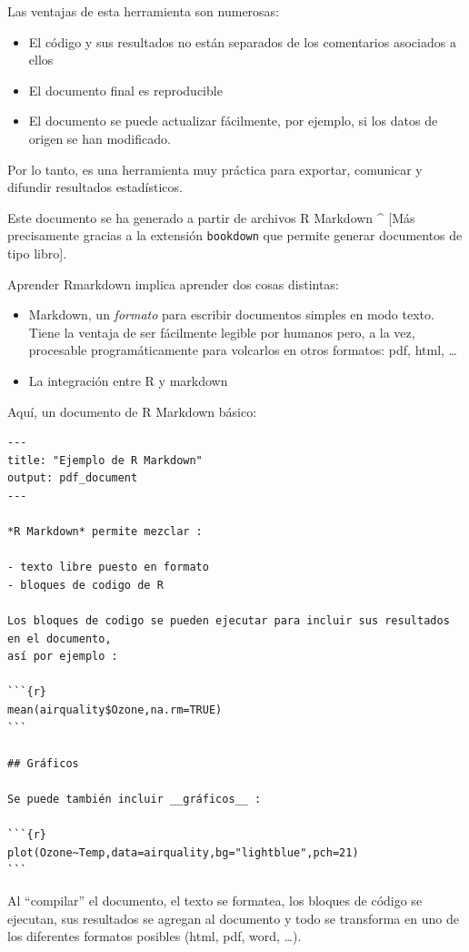 \documentclass[]{article}
\providecommand{\tightlist}{%
  \setlength{\itemsep}{0pt}\setlength{\parskip}{0pt}}
\numberwithin{ejcnt}{section}
\begin{document}
Las ventajas de esta herramienta son numerosas:

\begin{itemize}
\tightlist
\item
  El código y sus resultados no están separados de los comentarios asociados a ellos
\item
  El documento final es reproducible
\item
  El documento se puede actualizar fácilmente, por ejemplo, si los datos de origen se han modificado.
\end{itemize}

Por lo tanto, es una herramienta muy práctica para exportar, comunicar y difundir resultados estadísticos.

Este documento se ha generado a partir de archivos R Markdown \^{} {[}Más precisamente gracias a la extensión \texttt{bookdown} que permite generar documentos de tipo libro{]}.

Aprender Rmarkdown implica aprender dos cosas distintas:

\begin{itemize}
\tightlist
\item
  Markdown, un \emph{formato} para escribir documentos simples en modo texto. Tiene la ventaja de ser fácilmente legible por humanos pero, a la vez, procesable programáticamente para volcarlos en otros formatos: pdf, html, \ldots{}
\item
  La integración entre R y markdown
\end{itemize}

Aquí, un documento de R Markdown básico:

\begin{verbatim}
---
title: "Ejemplo de R Markdown"
output: pdf_document
---

*R Markdown* permite mezclar :

- texto libre puesto en formato
- bloques de codigo de R

Los bloques de codigo se pueden ejecutar para incluir sus resultados en el documento,
así por ejemplo :

```{r}
mean(airquality$Ozone,na.rm=TRUE)
```

## Gráficos

Se puede también incluir __gráficos__ :

```{r}
plot(Ozone~Temp,data=airquality,bg="lightblue",pch=21)
```
\end{verbatim}

Al ``compilar'' el documento, el texto se formatea, los bloques de código se ejecutan, sus resultados se agregan al documento y todo se transforma en uno de los diferentes formatos posibles (html, pdf, word, \ldots).
\end{document}

